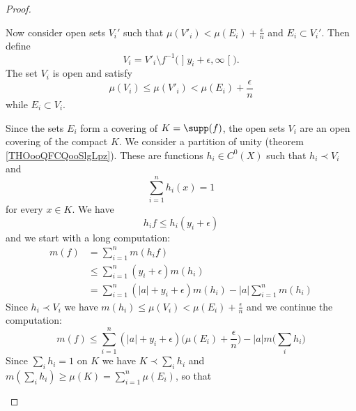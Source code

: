 \begin{proof}
\begin{subproof}
            Now consider open sets \( V_i'\) such that \( \mu(V'_i)<\mu(E_i)+\frac{ \epsilon }{ n }\) and \( E_i\subset V_i'\). Then define
            \begin{equation}
            V_i=V'_i\setminus f^{-1}\big( \mathopen] y_i+\epsilon , \infty \mathclose[ \big).
            \end{equation}
            The set \( V_i\) is open and satisfy
            \begin{equation}
                \mu(V_i)\leq\mu(V'_i)<\mu(E_i)+\frac{ \epsilon }{ n }
            \end{equation}
            while \( E_i\subset V_i\).

            Since the sets \( E_i\) form a covering of \( K=\supp(f)\), the open sets \( V_i\) are an open covering of the compact \( K\). We consider a partition of unity (theorem \ref{THOooQFCQooSlgLpz}). These are functions \( h_i\in C^0(X)\) such that \( h_i\prec V_i\) and
            \begin{equation}
                    \sum_{i=1}^nh_i(x)=1
            \end{equation}
            for every \( x\in K\). We have
            \begin{equation}
                h_if\leq h_i(y_i+\epsilon)
            \end{equation}
            and we start with a long computation:
            \begin{subequations}
                \begin{align}
                    m(f)&=\sum_{i=1}^nm(h_if)\\
                    &\leq \sum_{i=1}^n(y_i+\epsilon)m(h_i)\\
                    &=\sum_{i=1}^n(| a |+y_i+\epsilon)m(h_i)-| a |\sum_{i=1}^nm(h_i)
                \end{align}
            \end{subequations}
            Since \( h_i\prec V_i\) we have \( m(h_i)\leq \mu(V_i)<\mu(E_i)+\frac{ \epsilon }{ n }\) and we continue the computation:
            \begin{equation}
                    m(f)\leq \sum_{i=1}^n(| a |+y_i+\epsilon)\big( \mu(E_i)+\frac{ \epsilon }{ n } \big)-| a |m\big( \sum_i h_i \big)
            \end{equation}
            Since \( \sum_ih_i=1\) on \( K\) we have \( K\prec\sum_ih_i\) and \( m(\sum_ih_i)\geq \mu(K)=\sum_{i=1}^n\mu(E_i)\), so that
            \begin{subequations}

\end{subequations}
\end{subproof}
\end{proof}
